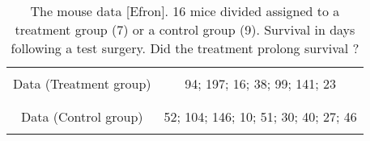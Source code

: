 

\begin{table}[!h]
\begin{tabular}{|c|c|}
\hline
&\\
 Data (Treatment group) & 94; 197; 16; 38; 99; 141; 23 \\
&\\
\hline
& \\
Data (Control group) & 52; 104; 146; 10; 51; 30; 40; 27; 46 \\
& \\
\hline
\end{tabular}
\caption{The mouse data [Efron]. 16 mice divided assigned to a treatment group (7) or a control group (9). Survival in days following a test surgery. \alert{Did the treatment prolong survival ?} }
\end{table}

